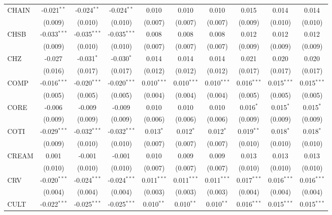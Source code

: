 \begin{table}[!htbp]
\begin{tabular}{@{\extracolsep{5pt}}lccccccccc}
 CHAIN & -0.021$^{**}$ & -0.024$^{**}$ & -0.024$^{**}$ & 0.010$^{}$ & 0.010$^{}$ & 0.010$^{}$ & 0.015$^{}$ & 0.014$^{}$ & 0.014$^{}$ \\
  & (0.009) & (0.010) & (0.010) & (0.007) & (0.007) & (0.007) & (0.009) & (0.010) & (0.010) \\
 CHSB & -0.033$^{***}$ & -0.035$^{***}$ & -0.035$^{***}$ & 0.008$^{}$ & 0.008$^{}$ & 0.008$^{}$ & 0.012$^{}$ & 0.012$^{}$ & 0.012$^{}$ \\
  & (0.009) & (0.010) & (0.010) & (0.007) & (0.007) & (0.007) & (0.009) & (0.009) & (0.009) \\
 CHZ & -0.027$^{}$ & -0.031$^{*}$ & -0.030$^{*}$ & 0.014$^{}$ & 0.014$^{}$ & 0.014$^{}$ & 0.021$^{}$ & 0.020$^{}$ & 0.020$^{}$ \\
  & (0.016) & (0.017) & (0.017) & (0.012) & (0.012) & (0.012) & (0.017) & (0.017) & (0.017) \\
 COMP & -0.016$^{***}$ & -0.020$^{***}$ & -0.020$^{***}$ & 0.010$^{***}$ & 0.010$^{***}$ & 0.010$^{***}$ & 0.016$^{***}$ & 0.015$^{***}$ & 0.015$^{***}$ \\
  & (0.005) & (0.005) & (0.005) & (0.004) & (0.004) & (0.004) & (0.005) & (0.005) & (0.005) \\
 CORE & -0.006$^{}$ & -0.009$^{}$ & -0.009$^{}$ & 0.010$^{}$ & 0.010$^{}$ & 0.010$^{}$ & 0.016$^{*}$ & 0.015$^{*}$ & 0.015$^{*}$ \\
  & (0.009) & (0.009) & (0.009) & (0.006) & (0.006) & (0.006) & (0.009) & (0.009) & (0.009) \\
 COTI & -0.029$^{***}$ & -0.032$^{***}$ & -0.032$^{***}$ & 0.013$^{*}$ & 0.012$^{*}$ & 0.012$^{*}$ & 0.019$^{**}$ & 0.018$^{*}$ & 0.018$^{*}$ \\
  & (0.009) & (0.010) & (0.010) & (0.007) & (0.007) & (0.007) & (0.010) & (0.010) & (0.010) \\
 CREAM & 0.001$^{}$ & -0.001$^{}$ & -0.001$^{}$ & 0.010$^{}$ & 0.009$^{}$ & 0.009$^{}$ & 0.013$^{}$ & 0.013$^{}$ & 0.013$^{}$ \\
  & (0.010) & (0.010) & (0.010) & (0.007) & (0.007) & (0.007) & (0.010) & (0.010) & (0.010) \\
 CRV & -0.020$^{***}$ & -0.024$^{***}$ & -0.024$^{***}$ & 0.011$^{***}$ & 0.011$^{***}$ & 0.011$^{***}$ & 0.017$^{***}$ & 0.016$^{***}$ & 0.016$^{***}$ \\
  & (0.004) & (0.004) & (0.004) & (0.003) & (0.003) & (0.003) & (0.004) & (0.004) & (0.004) \\
 CULT & -0.022$^{***}$ & -0.025$^{***}$ & -0.025$^{***}$ & 0.010$^{**}$ & 0.010$^{**}$ & 0.010$^{**}$ & 0.016$^{***}$ & 0.015$^{***}$ & 0.015$^{***}$ \\

\end{tabular}
\end{table}
